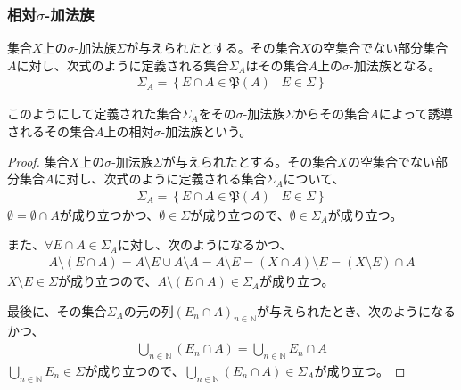 \documentclass[dvipdfmx]{jsarticle}
\begin{document}
\subsubsection{相対$\sigma$-加法族}%
\begin{thm}\label{4.5.2.7}
集合$X$上の$\sigma$-加法族$\varSigma$が与えられたとする。その集合$X$の空集合でない部分集合$A$に対し、次式のように定義される集合$\varSigma_{A}$はその集合$A$上の$\sigma$-加法族となる。
\begin{align*}
\varSigma_{A} = \left\{ E \cap A \in \mathfrak{P}(A) \middle| E \in \varSigma \right\}
\end{align*}
\end{thm}
\begin{dfn}
このようにして定義された集合$\varSigma_{A}$をその$\sigma$-加法族$\varSigma$からその集合$A$によって誘導されるその集合$A$上の相対$\sigma$-加法族という。
\end{dfn}
\begin{proof}
集合$X$上の$\sigma$-加法族$\varSigma$が与えられたとする。その集合$X$の空集合でない部分集合$A$に対し、次式のように定義される集合$\varSigma_{A}$について、
\begin{align*}
\varSigma_{A} = \left\{ E \cap A \in \mathfrak{P}(A) \middle| E \in \varSigma \right\}
\end{align*}
$\emptyset = \emptyset \cap A$が成り立つかつ、$\emptyset \in \varSigma$が成り立つので、$\emptyset \in \varSigma_{A}$が成り立つ。\par
また、$\forall E \cap A \in \varSigma_{A}$に対し、次のようになるかつ、
\begin{align*}
A \setminus (E \cap A) = A \setminus E \cup A \setminus A = A \setminus E = (X \cap A) \setminus E = (X \setminus E) \cap A
\end{align*}
$X \setminus E \in \varSigma$が成り立つので、$A \setminus (E \cap A) \in \varSigma_{A}$が成り立つ。\par
最後に、その集合$\varSigma_{A}$の元の列$\left( E_{n} \cap A \right)_{n \in \mathbb{N}}$が与えられたとき、次のようになるかつ、
\begin{align*}
\bigcup_{n \in \mathbb{N}} \left( E_{n} \cap A \right) = \bigcup_{n \in \mathbb{N}} E_{n} \cap A
\end{align*}
$\bigcup_{n \in \mathbb{N}} E_{n} \in \varSigma$が成り立つので、$\bigcup_{n \in \mathbb{N}} \left( E_{n} \cap A \right) \in \varSigma_{A}$が成り立つ。
\end{proof}
\end{document}
